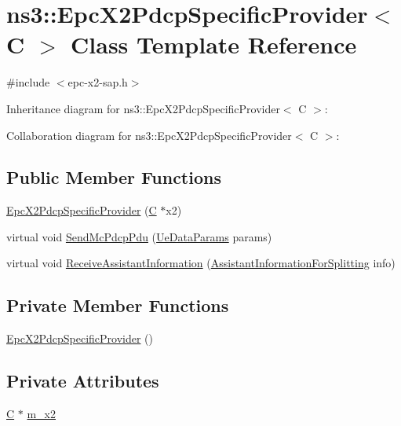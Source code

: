 \hypertarget{classns3_1_1EpcX2PdcpSpecificProvider}{}\section{ns3\+:\+:Epc\+X2\+Pdcp\+Specific\+Provider$<$ C $>$ Class Template Reference}
\label{classns3_1_1EpcX2PdcpSpecificProvider}


{\ttfamily \#include $<$epc-\/x2-\/sap.\+h$>$}



Inheritance diagram for ns3\+:\+:Epc\+X2\+Pdcp\+Specific\+Provider$<$ C $>$\+:


Collaboration diagram for ns3\+:\+:Epc\+X2\+Pdcp\+Specific\+Provider$<$ C $>$\+:
\subsection*{Public Member Functions}
\begin{DoxyCompactItemize}
\item 
\hyperlink{classns3_1_1EpcX2PdcpSpecificProvider_a5521be0abad4d6b8ae753abf4cc88985}{Epc\+X2\+Pdcp\+Specific\+Provider} (\hyperlink{loss__COST231__small__cities__urban_8m_aaa53ca0b650dfd85c4f59fa156f7a2cc}{C} $\ast$x2)
\item 
virtual void \hyperlink{classns3_1_1EpcX2PdcpSpecificProvider_a6093284140b7db1a5beeb07c880994e1}{Send\+Mc\+Pdcp\+Pdu} (\hyperlink{structns3_1_1EpcX2Sap_1_1UeDataParams}{Ue\+Data\+Params} params)
\item 
virtual void \hyperlink{classns3_1_1EpcX2PdcpSpecificProvider_a46b5f481cd513772680aefd20ba11d2f}{Receive\+Assistant\+Information} (\hyperlink{structns3_1_1EpcX2Sap_1_1AssistantInformationForSplitting}{Assistant\+Information\+For\+Splitting} info)
\end{DoxyCompactItemize}
\subsection*{Private Member Functions}
\begin{DoxyCompactItemize}
\item 
\hyperlink{classns3_1_1EpcX2PdcpSpecificProvider_a1fa2257e94f5f72dc8a1b7ae25efac9f}{Epc\+X2\+Pdcp\+Specific\+Provider} ()
\end{DoxyCompactItemize}
\subsection*{Private Attributes}
\begin{DoxyCompactItemize}
\item 
\hyperlink{loss__COST231__small__cities__urban_8m_aaa53ca0b650dfd85c4f59fa156f7a2cc}{C} $\ast$ \hyperlink{classns3_1_1EpcX2PdcpSpecificProvider_a38b6843ed2e3e63ced767795bd90c482}{m\+\_\+x2}
\end{DoxyCompactItemize}
